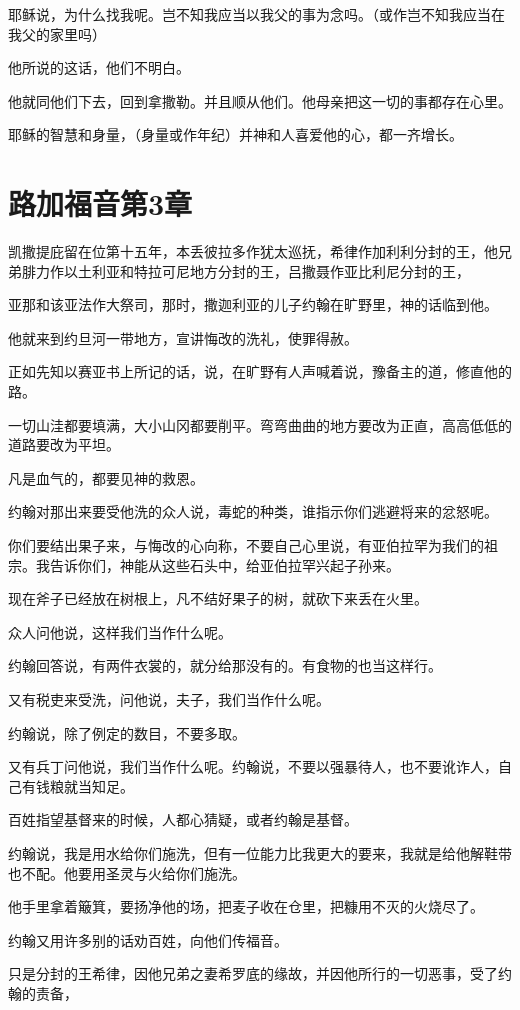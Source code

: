 \documentclass[12pt,oneside]{book}
\begin{document}
耶稣说，为什么找我呢。岂不知我应当以我父的事为念吗。（或作岂不知我应当在我父的家里吗）

他所说的这话，他们不明白。

他就同他们下去，回到拿撒勒。并且顺从他们。他母亲把这一切的事都存在心里。

耶稣的智慧和身量，（身量或作年纪）并神和人喜爱他的心，都一齐增长。

\chapter{路加福音第3章}
凯撒提庇留在位第十五年，本丢彼拉多作犹太巡抚，希律作加利利分封的王，他兄弟腓力作以土利亚和特拉可尼地方分封的王，吕撒聂作亚比利尼分封的王，

亚那和该亚法作大祭司，那时，撒迦利亚的儿子约翰在旷野里，神的话临到他。

他就来到约旦河一带地方，宣讲悔改的洗礼，使罪得赦。

正如先知以赛亚书上所记的话，说，在旷野有人声喊着说，豫备主的道，修直他的路。

一切山洼都要填满，大小山冈都要削平。弯弯曲曲的地方要改为正直，高高低低的道路要改为平坦。

凡是血气的，都要见神的救恩。

约翰对那出来要受他洗的众人说，毒蛇的种类，谁指示你们逃避将来的忿怒呢。

你们要结出果子来，与悔改的心向称，不要自己心里说，有亚伯拉罕为我们的祖宗。我告诉你们，神能从这些石头中，给亚伯拉罕兴起子孙来。

现在斧子已经放在树根上，凡不结好果子的树，就砍下来丢在火里。

众人问他说，这样我们当作什么呢。

约翰回答说，有两件衣裳的，就分给那没有的。有食物的也当这样行。

又有税吏来受洗，问他说，夫子，我们当作什么呢。

约翰说，除了例定的数目，不要多取。

又有兵丁问他说，我们当作什么呢。约翰说，不要以强暴待人，也不要讹诈人，自己有钱粮就当知足。

百姓指望基督来的时候，人都心猜疑，或者约翰是基督。

约翰说，我是用水给你们施洗，但有一位能力比我更大的要来，我就是给他解鞋带也不配。他要用圣灵与火给你们施洗。

他手里拿着簸箕，要扬净他的场，把麦子收在仓里，把糠用不灭的火烧尽了。

约翰又用许多别的话劝百姓，向他们传福音。

只是分封的王希律，因他兄弟之妻希罗底的缘故，并因他所行的一切恶事，受了约翰的责备，
\end{document}
